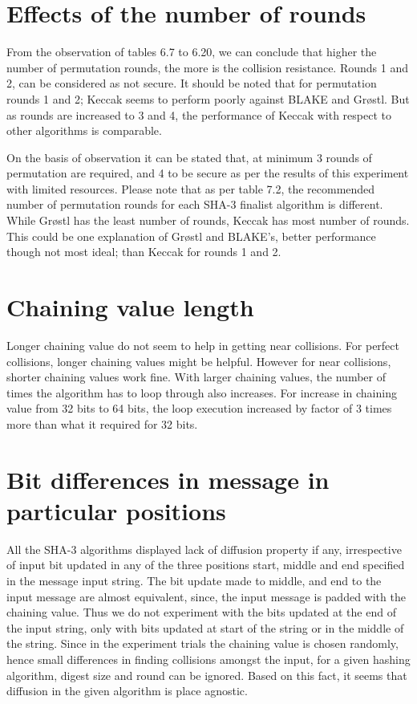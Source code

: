 \section{Effects of the number of rounds}

From the observation of tables 6.7 to 6.20, we can conclude that higher the number of permutation rounds, the
more is the collision resistance. Rounds 1 and 2, can be considered as not secure. It should be noted that
for permutation rounds 1 and 2; Keccak seems to perform poorly against BLAKE and Gr{\o}stl. But as rounds
are increased to 3 and 4, the performance of Keccak with respect to other algorithms is comparable. 

On the basis of observation it can be stated that, at minimum 3 rounds of permutation are required, and 4 to 
be secure as per the results of this experiment with limited resources. Please note that as per table 7.2,
the recommended number of permutation rounds for each SHA-3 finalist algorithm is different. While Gr{\o}stl
has the least number of rounds, Keccak has most number of rounds. This could be one explanation of Gr{\o}stl
and BLAKE's, better performance though not most ideal; than Keccak for rounds 1 and 2.

\section{Chaining value length}

Longer chaining value do not seem to help in getting near collisions. For perfect collisions, longer chaining values
might be helpful. However for near collisions, shorter chaining values work fine. With larger chaining values,
the number of times the algorithm has to loop through also increases. For increase in chaining value from 32 bits
to 64 bits, the loop execution increased by factor of 3 times more than what it required for 32 bits.

\section{Bit differences in message in particular positions}

All the SHA-3 algorithms displayed lack of diffusion property if any, irrespective of input bit updated in any
of the three positions start, middle and end specified in the message input string. The bit update made to middle,
and end to the input message are almost equivalent, since, the input message is padded with the chaining value. 
Thus we do not experiment with the bits updated at the end of the input string, only with bits updated at start
of the string or in the middle of the string. Since in the experiment trials the chaining value is chosen randomly,
hence small differences in finding collisions amongst the input, for a given hashing algorithm, digest size and round
can be ignored. Based on this fact, it seems that diffusion in the given algorithm is place agnostic. 

